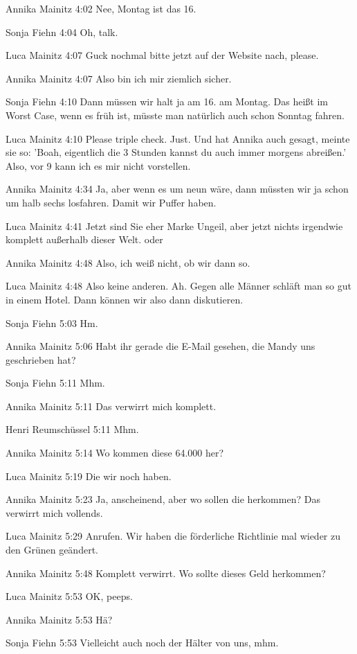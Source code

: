 Annika Mainitz   4:02
Nee, Montag ist das 16.

Sonja Fiehn   4:04
Oh, talk.

Luca Mainitz   4:07
Guck nochmal bitte jetzt auf der Website nach, please.

Annika Mainitz   4:07
Also bin ich mir ziemlich sicher.

Sonja Fiehn   4:10
Dann müssen wir halt ja am 16. am Montag. Das heißt im Worst Case, wenn es früh ist, müsste man natürlich auch schon Sonntag fahren.

Luca Mainitz   4:10
Please triple check.
Just.
Und hat Annika auch gesagt, meinte sie so: 'Boah, eigentlich die 3 Stunden kannst du auch immer morgens abreißen.'
Also, vor 9 kann ich es mir nicht vorstellen.

Annika Mainitz   4:34
Ja, aber wenn es um neun wäre, dann müssten wir ja schon um halb sechs losfahren.
Damit wir Puffer haben.

Luca Mainitz   4:41
Jetzt sind Sie eher Marke Ungeil, aber jetzt nichts irgendwie komplett außerhalb dieser Welt.
oder

Annika Mainitz   4:48
Also, ich weiß nicht, ob wir dann so.

Luca Mainitz   4:48
Also keine anderen.
Ah.
Gegen alle Männer schläft man so gut in einem Hotel.
Dann können wir also dann diskutieren.

Sonja Fiehn   5:03
Hm.

Annika Mainitz   5:06
Habt ihr gerade die E-Mail gesehen, die Mandy uns geschrieben hat?

Sonja Fiehn   5:11
Mhm.

Annika Mainitz   5:11
Das verwirrt mich komplett.

Henri Reumschüssel   5:11
Mhm.

Annika Mainitz   5:14
Wo kommen diese 64.000 her?

Luca Mainitz   5:19
Die wir noch haben.

Annika Mainitz   5:23
Ja, anscheinend, aber wo sollen die herkommen? Das verwirrt mich vollends.

Luca Mainitz   5:29
Anrufen.
Wir haben die förderliche Richtlinie mal wieder zu den Grünen geändert.

Annika Mainitz   5:48
Komplett verwirrt. Wo sollte dieses Geld herkommen?

Luca Mainitz   5:53
OK, peeps.

Annika Mainitz   5:53
Hä?

Sonja Fiehn   5:53
Vielleicht auch noch der Hälter von uns, mhm.

